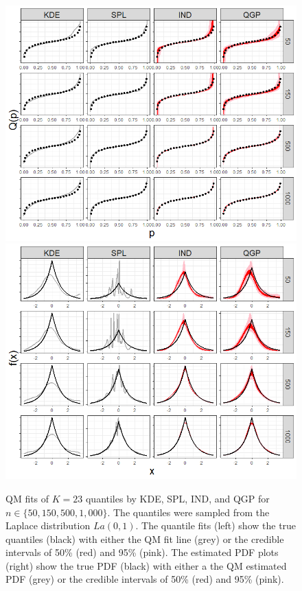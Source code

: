 \documentclass[preprint,12pt,authoryear]{elsarticle}
\begin{document}
\begin{figure}[hbt!]
\centering
  \centering
  \includegraphics[width=.49\linewidth]{Images/quants_lp.png}
  \centering
  \includegraphics[width=.49\linewidth]{Images/dens_lp.png}
\caption{QM fits of $K=23$ quantiles by KDE, SPL, IND, and QGP for $n \in \{50, 150, 500, 1{,}000\}$. The quantiles were sampled from the Laplace distribution $La(0,1)$. The quantile fits (left) show the true quantiles (black) with either the QM fit line (grey) or the credible intervals of 50\% (red) and 95\% (pink). 
The estimated PDF plots (right) show the true PDF (black) with either a the QM estimated PDF (grey) or the credible intervals of 50\% (red) and 95\% (pink).}
\label{fig:lp_fits}
\end{figure}
\end{document}
